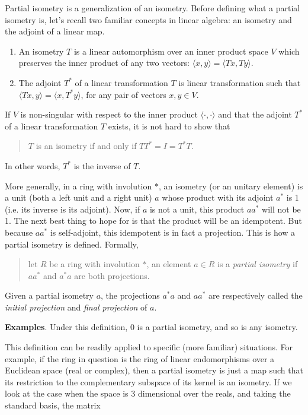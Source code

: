 \documentclass[12pt]{article}
\begin{document}
Partial isometry is a generalization of an isometry.  Before defining what a partial isometry is, let's recall two familiar concepts in linear algebra: an isometry and the adjoint of a linear map.

\begin{enumerate}
\item An isometry $T$ is a linear automorphism over an inner product space $V$ which preserves the inner product of any two vectors: $\langle x,y\rangle = \langle Tx, Ty\rangle$.  
\item The adjoint $T^*$ of a linear transformation $T$ is linear transformation such that $\langle Tx,y\rangle = \langle x, T^*y\rangle$, for any pair of vectors $x,y\in V$.

\end{enumerate}
If $V$ is non-singular with respect to the inner product $\langle \cdot,\cdot \rangle$ and that the adjoint $T^*$ of a linear transformation $T$ exists, it is not hard to show that 
\begin{quote}
$T$ is an isometry if and only if $TT^*=I=T^*T$.
\end{quote}
In other words, $T^*$ is the inverse of $T$.

More generally, in a ring with involution $*$, an isometry (or an unitary element) is a unit (both a left unit and a right unit) $a$ whose product with its adjoint $a^*$ is 1 (i.e. its inverse is its adjoint).  Now, if $a$ is not a unit, this product $aa^*$ 
will not be 1.  The next best thing to hope for is that the product will be an idempotent.  But because $aa^*$ is self-adjoint, this idempotent is in fact a projection.  This is how a partial isometry is defined.  Formally, 
\begin{quote}
let $R$ be a ring with involution $*$, an element $a\in R$ is a \emph{partial isometry} if $aa^*$ and $a^*a$ are both projections.
\end{quote}

Given a partial isometry $a$, the projections $a^*a$ and $aa^*$ are respectively called the \emph{initial projection} and \emph{final projection} of $a$.

\textbf{Examples}.  Under this definition, $0$ is a partial isometry, and so is any isometry.  

This definition can be readily applied to specific (more familiar) situations.  For example, if the ring in question is the ring of linear endomorphisms over a Euclidean space (real or complex), then a partial isometry is just a map such that its restriction to the complementary subspace of its kernel is an isometry.  If we look at the case when the space is 3 dimensional over the reals, and taking the standard basis, the matrix
\end{document}
